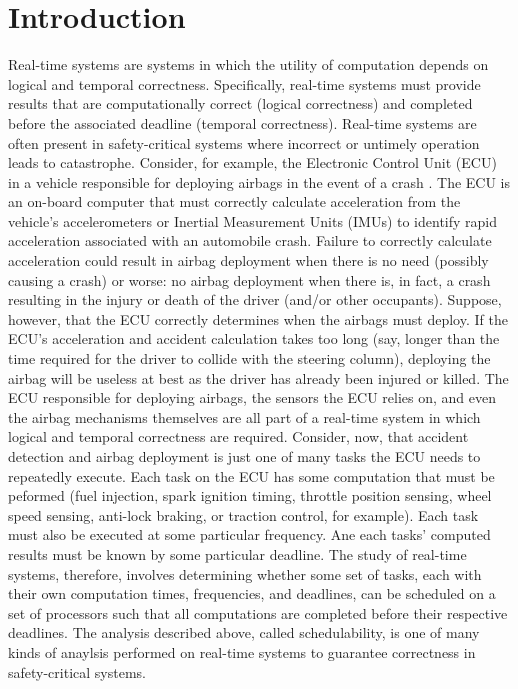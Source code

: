 \section{Introduction}   \label{chap:introduction}


Real-time systems are systems in which the utility of computation depends on logical and temporal correctness.
Specifically, real-time systems must provide results that are computationally correct (logical correctness) and completed before the associated deadline (temporal correctness).
Real-time systems are often present in safety-critical systems where incorrect or untimely operation leads to catastrophe.
Consider, for example, the Electronic Control Unit (ECU) in a vehicle responsible for deploying airbags in the event of a crash \cite{hartl_airbag_1990}.
The ECU is an on-board computer that must correctly calculate acceleration from the vehicle's accelerometers or Inertial Measurement Units (IMUs) to identify rapid acceleration associated with an automobile crash.
Failure to correctly calculate acceleration could result in airbag deployment when there is no need (possibly causing a crash) or worse: no airbag deployment when there is, in fact, a crash resulting in the injury or death of the driver (and/or other occupants).
Suppose, however, that the ECU correctly determines when the airbags must deploy.
If the ECU's acceleration and accident calculation takes too long (say, longer than the time required for the driver to collide with the steering column), deploying the airbag will be useless at best as the driver has already been injured or killed.
The ECU responsible for deploying airbags, the sensors the ECU relies on, and even the airbag mechanisms themselves are all part of a real-time system in which logical and temporal correctness are required.
Consider, now, that accident detection and airbag deployment is just one of many tasks the ECU needs to repeatedly execute.
Each task on the ECU has some computation that must be peformed (fuel injection, spark ignition timing, throttle position sensing, wheel speed sensing, anti-lock braking, or traction control, for example).
Each task must also be executed at some particular frequency.
Ane each tasks' computed results must be known by some particular deadline.
The study of real-time systems, therefore, involves determining whether some set of tasks, each with their own computation times, frequencies, and deadlines, can be scheduled on a set of processors such that all computations are completed before their respective deadlines.
The analysis described above, called schedulability, is one of many kinds of anaylsis performed on real-time systems to guarantee correctness in safety-critical systems.

